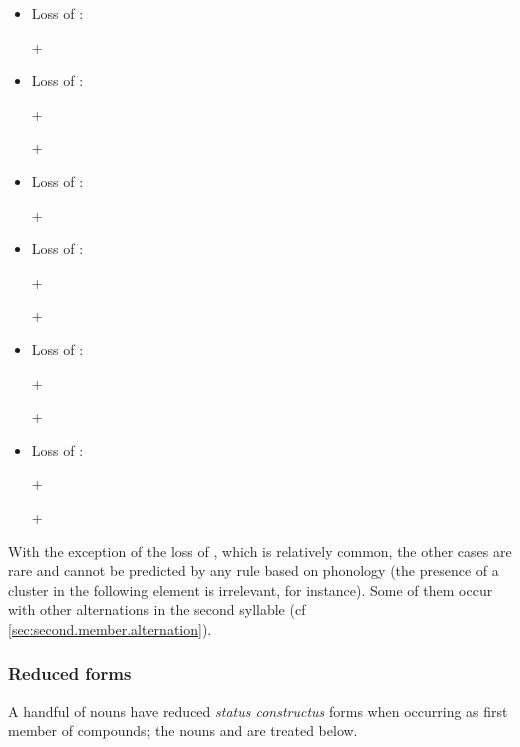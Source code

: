 \begin{itemize}
\item Loss of : 

  +  \fl{}    
\item Loss of  : 

 +  \fl{}   

  +  \fl{}   
\item Loss of : 

  +  \fl{}    
\item Loss of :

  +  \fl{}   

 +  \fl{}    
\item Loss of :

   +   \fl{}    
 
  +  \fl{}   
\item Loss of : 

 +  \fl{}    

 +  \fl{}    
\end{itemize}

With the exception of the loss of , which is relatively common, the other cases are rare and cannot be predicted by any rule based on phonology (the presence of a cluster in the following element is irrelevant, for instance). Some of them occur with other alternations in the second syllable (cf \ref{sec:second.member.alternation}).

\subsubsection{Reduced forms} \label{sec:reduced.forms.compounds}   
A handful of nouns have reduced \textit{status constructus} forms when occurring as first member of compounds; the nouns  and  are treated below. 

